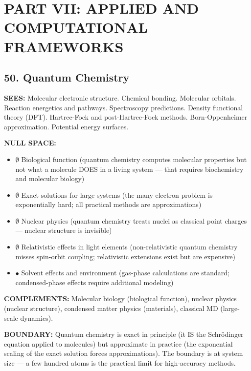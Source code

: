 \bigskip\noindent\makebox[\textwidth]{\color{rulegray}\rule{5cm}{0.3pt}}\bigskip


\chapter*{PART VII: APPLIED AND COMPUTATIONAL FRAMEWORKS}


\section*{50. Quantum Chemistry}


\textbf{SEES:} Molecular electronic structure. Chemical bonding. Molecular orbitals. Reaction energetics and pathways. Spectroscopy predictions. Density functional theory (DFT). Hartree-Fock and post-Hartree-Fock methods. Born-Oppenheimer approximation. Potential energy surfaces.


\textbf{NULL SPACE:}

\begin{itemize}[nosep,leftmargin=*]
  \item $\emptyset$ Biological function (quantum chemistry computes molecular properties but not what a molecule DOES in a living system — that requires biochemistry and molecular biology)
  \item $\emptyset$ Exact solutions for large systems (the many-electron problem is exponentially hard; all practical methods are approximations)
  \item $\emptyset$ Nuclear physics (quantum chemistry treats nuclei as classical point charges — nuclear structure is invisible)
  \item $\emptyset$ Relativistic effects in light elements (non-relativistic quantum chemistry misses spin-orbit coupling; relativistic extensions exist but are expensive)
  \item $\bullet$ Solvent effects and environment (gas-phase calculations are standard; condensed-phase effects require additional modeling)
\end{itemize}


\textbf{COMPLEMENTS:} Molecular biology (biological function), nuclear physics (nuclear structure), condensed matter physics (materials), classical MD (large-scale dynamics).


\textbf{BOUNDARY:} Quantum chemistry is exact in principle (it IS the Schrödinger equation applied to molecules) but approximate in practice (the exponential scaling of the exact solution forces approximations). The boundary is at system size — a few hundred atoms is the practical limit for high-accuracy methods.


